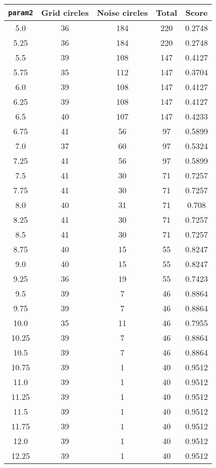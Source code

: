 \documentclass[letterpaper, 12pt]{article}
\begin{document}
\begin{longtable}{|c|c|c|c|c|}
\hline
\textbf{\texttt{param2}} & \textbf{Grid circles} & \textbf{Noise circles} & \textbf{Total} & \textbf{Score} \\
\hline
5.0 & 36 & 184 & 220 & 0.2748 \\
\hline
5.25 & 36 & 184 & 220 & 0.2748 \\
\hline
5.5 & 39 & 108 & 147 & 0.4127 \\
\hline
5.75 & 35 & 112 & 147 & 0.3704 \\
\hline
6.0 & 39 & 108 & 147 & 0.4127 \\
\hline
6.25 & 39 & 108 & 147 & 0.4127 \\
\hline
6.5 & 40 & 107 & 147 & 0.4233 \\
\hline
6.75 & 41 & 56 & 97 & 0.5899 \\
\hline
7.0 & 37 & 60 & 97 & 0.5324 \\
\hline
7.25 & 41 & 56 & 97 & 0.5899 \\
\hline
7.5 & 41 & 30 & 71 & 0.7257 \\
\hline
7.75 & 41 & 30 & 71 & 0.7257 \\
\hline
8.0 & 40 & 31 & 71 & 0.708 \\
\hline
8.25 & 41 & 30 & 71 & 0.7257 \\
\hline
8.5 & 41 & 30 & 71 & 0.7257 \\
\hline
8.75 & 40 & 15 & 55 & 0.8247 \\
\hline
9.0 & 40 & 15 & 55 & 0.8247 \\
\hline
9.25 & 36 & 19 & 55 & 0.7423 \\
\hline
9.5 & 39 & 7 & 46 & 0.8864 \\
\hline
9.75 & 39 & 7 & 46 & 0.8864 \\
\hline
10.0 & 35 & 11 & 46 & 0.7955 \\
\hline
10.25 & 39 & 7 & 46 & 0.8864 \\
\hline
10.5 & 39 & 7 & 46 & 0.8864 \\
\hline
10.75 & 39 & 1 & 40 & 0.9512 \\
\hline
11.0 & 39 & 1 & 40 & 0.9512 \\
\hline
11.25 & 39 & 1 & 40 & 0.9512 \\
\hline
11.5 & 39 & 1 & 40 & 0.9512 \\
\hline
11.75 & 39 & 1 & 40 & 0.9512 \\
\hline
12.0 & 39 & 1 & 40 & 0.9512 \\
\hline
12.25 & 39 & 1 & 40 & 0.9512 \\
\hline

\end{longtable}
\end{document}
